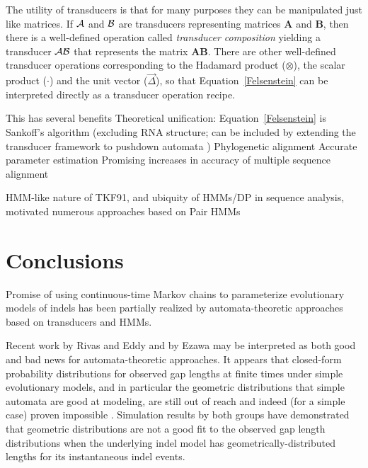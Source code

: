 \documentclass{bmcart}
\newcommand{\matr}[1]{\mathbf{#1}}
\newcommand{\trans}[1]{{\cal #1}}
\newcommand{\eqref}[1]{Equation~\ref{#1}}
\newcommand{\unitvec}{\vec{\Delta}}
\newcommand{\pointprod}{\otimes}
\newcommand{\scalarprod}{\cdot}
\begin{document}
The utility of transducers is that for many purposes they can be manipulated just like matrices.
If $\trans{A}$ and $\trans{B}$ are transducers representing matrices $\matr{A}$ and $\matr{B}$,
then there is a well-defined operation called {\em transducer composition}
yielding a transducer $\trans{A}\trans{B}$ that represents the matrix $\matr{A}\matr{B}$.
There are other well-defined transducer operations corresponding to the Hadamard product
($\pointprod$), the scalar product ($\scalarprod$) and the unit vector ($\unitvec$),
so that \eqref{Felsenstein} can be interpreted directly
as a transducer operation recipe.

This has several benefits
Theoretical unification: \eqref{Felsenstein} is Sankoff's algorithm \cite{Sankoff85}
(excluding RNA structure; can be included by extending the transducer
framework to pushdown automata \cite{BradleyHolmes2009})
Phylogenetic alignment \cite{RedelingsSuchard2005,RedelingsSuchard2007}
Accurate parameter estimation \cite{WestessonEtAl2012,Redelings2014}
Promising increases in accuracy of multiple sequence alignment \cite{IndelHistorian}

HMM-like nature of TKF91, and ubiquity of HMMs/DP in sequence analysis,
motivated numerous approaches based on Pair HMMs
\cite{ThorneEtal92,KnudsenMiyamoto2003,WangKeightleyJohnson2006,RivasEddy2008,RivasEddy2015}

\section*{Conclusions}

Promise of using continuous-time Markov chains to parameterize evolutionary models of indels
has been partially realized by automata-theoretic approaches
based on transducers and HMMs.

Recent work by Rivas and Eddy \cite{RivasEddy2015}
and by Ezawa \cite{Ezawa2016a,Ezawa2016b,Ezawa2016bErratum}
may be interpreted as both good and bad news for automata-theoretic approaches.
It appears that closed-form probability distributions for observed gap lengths at finite times
under simple evolutionary models,
and in particular the geometric distributions that simple automata are good at modeling,
are still out of reach and indeed (for a simple case) proven impossible \cite{RivasEddy2015}.
Simulation results by both groups have demonstrated that geometric distributions are not
a good fit to the observed gap length distributions when the underlying indel model
has geometrically-distributed lengths for its instantaneous indel events.
\end{document}
